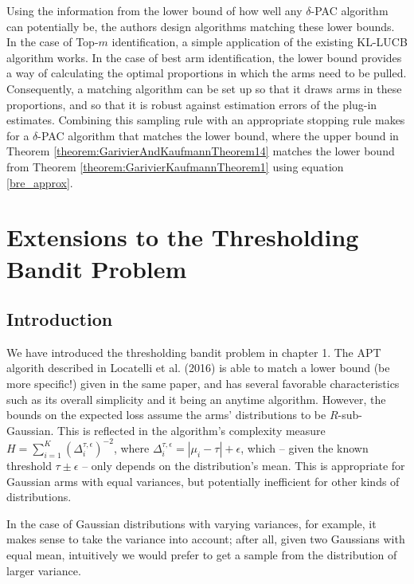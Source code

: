 \documentclass[12pt,]{article}
\begin{document}
Using the information from the lower bound of how well any
\(\delta\)-PAC algorithm can potentially be, the authors design
algorithms matching these lower bounds. In the case of Top-\(m\)
identification, a simple application of the existing KL-LUCB algorithm
works. In the case of best arm identification, the lower bound provides
a way of calculating the optimal proportions in which the arms need to
be pulled. Consequently, a matching algorithm can be set up so that it
draws arms in these proportions, and so that it is robust against
estimation errors of the plug-in estimates. Combining this sampling rule
with an appropriate stopping rule makes for a \(\delta\)-PAC algorithm
that matches the lower bound, where the upper bound in Theorem
\ref{theorem:GarivierAndKaufmannTheorem14} matches the lower bound from
Theorem \ref{theorem:GarivierKaufmannTheorem1} using equation
\eqref{bre_approx}.

\newpage

\section{Extensions to the Thresholding Bandit
Problem}\label{extensions-to-the-thresholding-bandit-problem}

\subsection{Introduction}\label{introduction}

We have introduced the thresholding bandit problem in chapter 1. The APT
algorith described in Locatelli et al. (2016) is able to match a lower
bound (be more specific!) given in the same paper, and has several
favorable characteristics such as its overall simplicity and it being an
anytime algorithm. However, the bounds on the expected loss assume the
arms' distributions to be \(R\)-sub-Gaussian. This is reflected in the
algorithm's complexity measure
\(H = \sum_{i=1}^K (\Delta_i^{\tau, \epsilon})^{-2}\), where
\(\Delta_i^{\tau,\epsilon} = |\mu_i - \tau| + \epsilon\), which -- given
the known threshold \(\tau \pm \epsilon\) -- only depends on the
distribution's mean. This is appropriate for Gaussian arms with equal
variances, but potentially inefficient for other kinds of distributions.

In the case of Gaussian distributions with varying variances, for
example, it makes sense to take the variance into account; after all,
given two Gaussians with equal mean, intuitively we would prefer to get
a sample from the distribution of larger variance.
\end{document}
